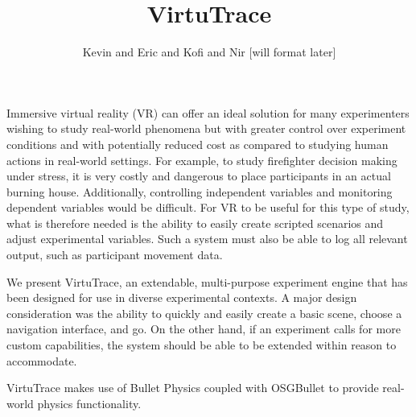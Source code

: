 \documentclass[draftcls,conference,letterpaper]{IEEEtran}
\title{VirtuTrace}
\author{Kevin and Eric and Kofi and Nir [will format later]}
\begin{document}
\maketitle


Immersive virtual reality (VR) can offer an ideal solution for many experimenters wishing to study real-world phenomena but with greater control over experiment conditions and with potentially reduced cost as compared to studying human actions in real-world settings. For example, to study firefighter decision making under stress, it is very costly and dangerous to place participants in an actual burning house. Additionally, controlling independent variables and monitoring dependent variables would be difficult. For VR to be useful for this type of study, what is therefore needed is the ability to easily create scripted scenarios and adjust experimental variables. Such a system must also be able to log all relevant output, such as participant movement data.

We present VirtuTrace, an extendable, multi-purpose experiment engine that has been designed for use in diverse experimental contexts. A major design consideration was the ability to quickly and easily create a basic scene, choose a navigation interface, and go. On the other hand, if an experiment calls for more custom capabilities, the system should be able to be extended within reason to accommodate.

%

VirtuTrace makes use of Bullet Physics coupled with OSGBullet to provide real-world physics functionality.


%
%
\end{document}
